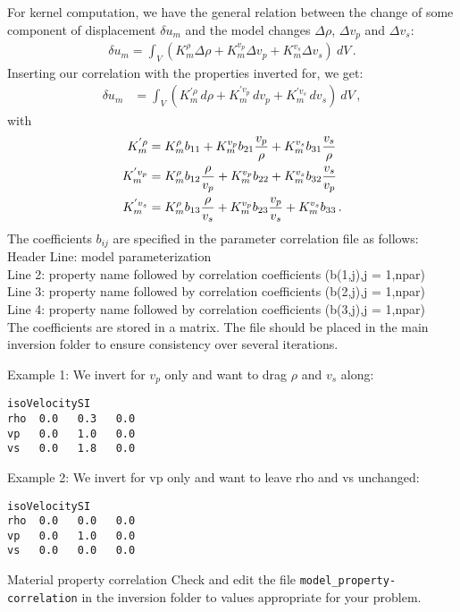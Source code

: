 For kernel computation, we have the general relation between the change of some component of displacement $\delta u_m$ and the model changes $\Delta\rho$, $\Delta v_p$ and $\Delta v_s$:
\begin{align}
	\delta u_m = \int_V \left(K_m^{\rho}\Delta\rho+K_m^{v_p}\Delta v_p+K_m^{v_s}\Delta v_s\right)\ dV \,.
\end{align}
Inserting our correlation with the properties inverted for, we get:
\begin{align}
   \delta u_m &= \int_V \left(K_m^{'\rho}\,d\rho + K_m^{'v_p}\,dv_p + K_m^{'v_s}\,dv_s\right)\ dV \,,
\end{align}
with
\begin{align}
	K_m^{'\rho} &= K_m^{\rho}b_{11}+K_m^{v_p}b_{21}\frac{v_p}{\rho}+K_m^{v_s}b_{31}\frac{v_s}{\rho} \notag \\
	K_m^{'v_p} & = K_m^{\rho}b_{12}\frac{\rho}{v_p} +K_m^{v_p}b_{22} +K_m^{v_s}b_{32}\frac{v_s}{v_p} \notag \\
	K_m^{'v_s} & = K_m^{\rho}b_{13}\frac{\rho}{v_s} +K_m^{v_p}b_{23}\frac{v_p}{v_s} +K_m^{v_s}b_{33}\,.
\end{align}
%
The coefficients $b_{ij}$ are specified in the parameter correlation file as follows:\\
Header Line: model parameterization \\
Line 2: property name followed by correlation coefficients  (b(1,j),j = 1,npar)\\
Line 3: property name followed by correlation coefficients  (b(2,j),j = 1,npar)\\
Line 4: property name followed by correlation coefficients  (b(3,j),j = 1,npar)\\
The coefficients are stored in a matrix. The file should be placed in the main inversion folder to ensure consistency over several iterations.

Example 1: We invert for $v_p$ only and want to drag $\rho$ and $v_s$ along:
\begin{verbatim}
isoVelocitySI
rho  0.0   0.3   0.0
vp   0.0   1.0   0.0
vs   0.0   1.8   0.0
\end{verbatim}
Example 2: We invert for vp only and want to leave rho and vs unchanged:
\begin{verbatim}
isoVelocitySI
rho  0.0   0.0   0.0
vp   0.0   1.0   0.0
vs   0.0   0.0   0.0
\end{verbatim}
%
\begin{actionbox}[label={action:property-correlation},float=h!]{Material property correlation}
   Check and edit the file \verb+model_property-correlation+ in the inversion folder to values appropriate for your problem.
\end{actionbox}
%
